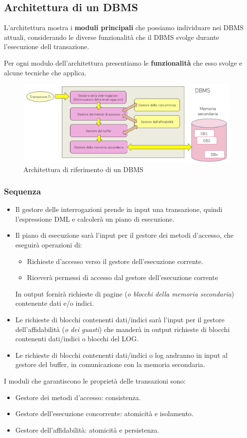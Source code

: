 \documentclass[oneside,a4paper,11pt]{book}
\theoremstyle{italicstyle}
\theoremstyle{normStyle}
\begin{document}
\subsection{Architettura di un DBMS}
L'architettura mostra i \textbf{moduli principali} che possiamo individuare nei DBMS attuali,
considerando le diverse funzionalità che il DBMS svolge durante l'esecuzione dell 
transazione.

Per ogni modulo dell'architettura presentiamo le \textbf{funzionalità} 
che esso svolge e alcune tecniche che applica.
\begin{figure}[H]
    \centering
    \includegraphics[width=15cm]{img/gestoriDBMS.jpeg}
    \caption{Architettura di riferimento di un DBMS}
    \label{fig:arhc_DBMS}
  \end{figure}
\subsubsection{Sequenza}
\begin{itemize}
    \item Il gestore delle interrogazioni prende in input una transazione, quindi 
    l'espressione DML e calcolerà un piano di esecuzione.
    \item Il piano di esecuzione sarà l'input per il gestore dei metodi 
    d'accesso, che eseguirà operazioni di:
    \begin{itemize}
        \item Richieste d'accesso verso il 
        gestore dell'esecuzione corrente.
        \item Riceverà permessi di accesso dal gestore dell'esecuzione 
        corrente
    \end{itemize}
    In output fornirà richieste di pagine (\textit{o blocchi della memoria 
    secondaria}) contenente dati e/o indici.
    \item  Le richieste di blocchi contenenti dati/indici sarà 
    l'input per il gestore dell'affidabilità (\textit{o dei guasti}) che manderà
    in output richieste di blocchi contenenti dati/indici o blocchi del LOG.
    \item Le richieste di blocchi contenenti dati/indici o log andranno in 
    input al gestore del buffer, in comunicazione con la memoria secondaria.
\end{itemize}
I moduli che garantiscono le proprietà delle transazioni sono:
\begin{itemize}
    \item Gestore dei metodi d'accesso: consistenza.
    \item Gestore dell'esecuzione concorrente: atomicità e isolamento.
    \item Gestore dell'affidabilità: atomicità e persistenza. 
\end{itemize}
\end{document}
